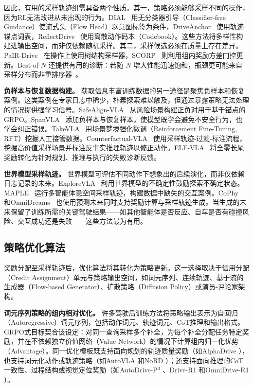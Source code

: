 \documentclass[runningheads]{llncs}
\begin{document}
因此，有用的采样轨迹组需具备两个性质。其一，策略必须能够采样不同的操作，因为RL无法改进从未出现的行为。DIAL~\cite{dial2026} 用无分类器引导（Classifier-free Guidance）使流式头（Flow Head）以意图标签为条件，DriveAnchor~\cite{driveanchor2026} 使用轨迹锚点词表，ReflectDrive~\cite{reflectdrive2025} 使用离散动作码本（Codebook）。这些方法将多样性构建进输出空间，而非仅依赖随机采样。其二，采样候选必须在质量上存在差异。PaIR-Drive~\cite{pairdrive2026} 在操作上使用树结构采样器，SCORP~\cite{scorp2026} 则利用组内奖励方差门控更新。Best-of-$N$ 还提供有用的诊断：若随 $N$ 增大性能迅速饱和，瓶颈更可能来自采样分布而非重排序器~\cite{dial2026}。

\textbf{负样本与恢复数据构建。}
获取信息丰富训练数据的另一途径是聚焦负样本和恢复案例。这类案例在专家日志中稀少，朴素探索难以触及，但通过暴露策略无法处理的情况提供强学习信号。SafeAlign-VLA~\cite{safealignvla2026} 从风险场景构建正负对用于基于锚点的GRPO。SpanVLA~\cite{spanvla2026} 添加负样本与恢复样本，使模型既学会避免不安全行为，也学会纠正错误。TakeVLA~\cite{takevla2026} 用场景梦境强化微调（Reinforcement Fine-Tuning, RFT）挖掘人工接管数据。Counterfactual-VLA~\cite{peng2026counterfactual} 使用采样轨迹-过滤-标注流程，挖掘高价值采样场景并标注反事实推理轨迹以修正动作。ELF-VLA~\cite{elfvla2026} 将全零长尾奖励转化为针对规划、推理与执行的失败诊断反馈。

\textbf{世界模型采样轨迹。}
世界模型可评估不同动作下想象出的后续演化，而非仅依赖日志记录的未来。ExploreVLA~\cite{explorevla2026} 利用世界模型的不确定性鼓励探索不确定状态。MAPLE~\cite{maple2026} 运行多智能体隐空间采样轨迹，构建数据中缺失的交互案例。CoPhy~\cite{cophy2026} 和OmniDreams~\cite{omnidreams2026} 也使用预测未来同时支持奖励计算与采样轨迹生成。当生成的未来保留了训练所需的关键驾驶结果——如其他智能体是否反应、自车是否有碰撞风险、交互成功还是失败——这些方法最为有用。

\subsection{策略优化算法}
\label{sec:algorithms}
奖励分配至采样轨迹后，优化算法将其转化为策略更新。这一选择取决于信用分配（Credit Assignment）单元与策略输出空间，如词元序列、连续轨迹、基于流的生成器（Flow-based Generator）、扩散策略（Diffusion Policy）或演员-评论家架构。

\textbf{词元序列策略的组内相对优化。}
许多驾驶后训练方法将策略输出表示为自回归（Autoregressive）词元序列，包括动作词元、轨迹词元、CoT推理和输出格式。GRPO式目标契合该设定：对同一查询采样多个补全，为每个补全分配任务特定奖励，并在不依赖独立价值网络（Value Network）的情况下计算组内归一化优势（Advantage）。同一优化模板既支持面向规划的轨迹质量奖励（如AlphaDrive \cite{alphadrive2025}），也支持词元化动作或轨迹策略（如AutoVLA \cite{autovla2025} 和NoRD \cite{nord2026}）；还支持面向推理的CoT一致性、过程结构或视觉定位奖励（如AutoDrive-P$^3$ \cite{autodrivep3_2026}、Drive-R1 \cite{li2026drive} 和OmniDrive-R1 \cite{zhang2026omnidrive}）。
\end{document}
